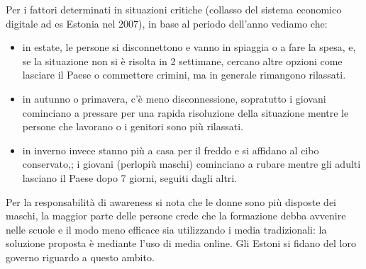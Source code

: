 \documentclass[a4page, 11pt, twocolumn]{article}
\begin{document}
Per i fattori determinati in situazioni critiche (collasso del sistema economico digitale ad es Estonia nel 2007), in base al periodo dell'anno vediamo che:
\begin{itemize}
  \item in estate, le persone si disconnettono e vanno in spiaggia o a fare la spesa, e, se la situazione non si è risolta in 2 settimane, cercano altre opzioni come lasciare il Paese o commettere crimini, ma in generale rimangono rilassati.
  \item in autunno o primavera, c'è meno disconnessione, sopratutto i giovani cominciano a pressare per una rapida risoluzione della situazione mentre le persone che lavorano o i genitori sono più rilassati.
  \item in inverno invece stanno più a casa per il freddo e si affidano al cibo conservato,; i giovani (perlopiù maschi) cominciano a rubare mentre gli adulti lasciano il Paese dopo 7 giorni, seguiti dagli altri.
\end{itemize}

Per la responsabilità di awareness si nota che le donne sono più disposte dei maschi, la maggior parte delle persone crede che la formazione debba avvenire nelle scuole e il modo meno efficace sia utilizzando i media tradizionali: la soluzione proposta è mediante l'uso di media online.
Gli Estoni si fidano del loro governo riguardo a questo ambito.
\end{document}
